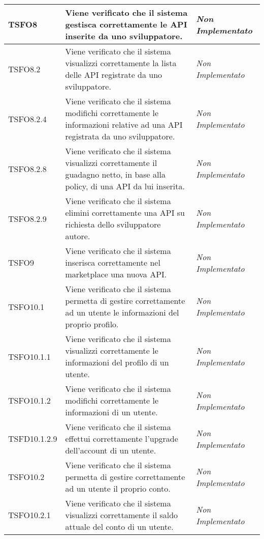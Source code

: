 \begin{longtable}{|>{\centering\arraybackslash}p{2.3cm}|>{\centering\arraybackslash}p{7.5cm} | >{\centering\arraybackslash}p{3.8cm}|}
		\hypertarget{TSFO8}{TSFO8} & Viene verificato che il sistema gestisca correttamente le API inserite da uno sviluppatore. & \textit{Non Implementato}\\ \hline
		\hypertarget{TSFO8.2}{TSFO8.2} & Viene verificato che il sistema visualizzi correttamente la lista delle API registrate da uno sviluppatore. & \textit{Non Implementato}\\ \hline
		\hypertarget{TSFO8.2.4}{TSFO8.2.4} & Viene verificato che il sistema modifichi correttamente le informazioni relative ad una API registrata da uno sviluppatore. & \textit{Non Implementato}\\ \hline
		\hypertarget{TSFO8.2.8}{TSFO8.2.8} & Viene verificato che il sistema visualizzi correttamente il guadagno netto, in base alla policy, di una API da lui inserita. & \textit{Non Implementato}\\ \hline
		\hypertarget{TSFO8.2.9}{TSFO8.2.9} & Viene verificato che il sistema elimini correttamente una API su richiesta dello sviluppatore autore. & \textit{Non Implementato}\\ \hline
		\hypertarget{TSFO9}{TSFO9} & Viene verificato che il sistema inserisca correttamente nel marketplace una nuova API. & \textit{Non Implementato}\\ \hline
		\hypertarget{TSFO10.1}{TSFO10.1} & Viene verificato che il sistema permetta di gestire correttamente ad un utente le informazioni del proprio profilo. & \textit{Non Implementato}\\ \hline
		\hypertarget{TSFO10.1.1}{TSFO10.1.1} & Viene verificato che il sistema visualizzi correttamente le informazioni del profilo di un utente. & \textit{Non Implementato}\\ \hline
		\hypertarget{TSFO10.1.2}{TSFO10.1.2} & Viene verificato che il sistema modifichi correttamente le informazioni di un utente. & \textit{Non Implementato}\\ \hline
		\hypertarget{TSFD10.1.2.9}{TSFD10.1.2.9} & Viene verificato che il sistema effettui correttamente l'upgrade dell'account di un utente. & \textit{Non Implementato}\\ \hline
		\hypertarget{TSFO10.2}{TSFO10.2} & Viene verificato che il sistema permetta di gestire correttamente ad un utente il proprio conto. & \textit{Non Implementato}\\ \hline
		\hypertarget{TSFO10.2.1}{TSFO10.2.1} & Viene verificato che il sistema visualizzi correttamente il saldo attuale del conto di un utente. & \textit{Non Implementato}\\ \hline

\end{longtable}
